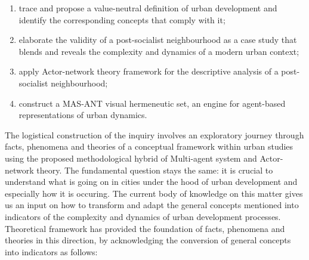 \documentclass[11pt]{report}
\begin{document}
\begin{enumerate}
\item trace and propose a value-neutral definition of urban development and identify the corresponding concepts that comply with it;
\item elaborate the validity of a post-socialist neighbourhood as a case study that blends and reveals the complexity and dynamics of a modern urban context;
\item apply Actor-network theory framework for the descriptive analysis of a post-socialist neighbourhood;
\item construct a MAS-ANT visual hermeneutic set, an engine for agent-based representations of urban dynamics.    
\end{enumerate}

The logistical construction of the inquiry involves an exploratory journey through facts, phenomena and theories of a conceptual framework within urban studies using the proposed methodological hybrid of Multi-agent system and Actor-network theory. The fundamental question stays the same: it is crucial to understand what is going on in cities under the hood of urban development and especially how it is occuring.
The current body of knowledge on this matter gives us an input on how to transform and adapt the general concepts mentioned into indicators of the complexity and dynamics of urban development processes. Theoretical framework has provided the foundation of facts, phenomena and theories in this direction, by acknowledging the conversion of general concepts into indicators as follows:
\end{document}
